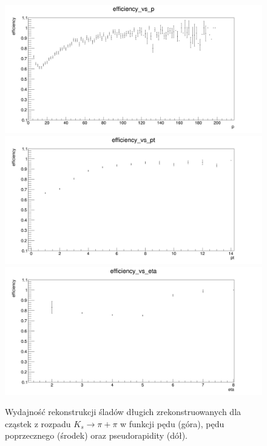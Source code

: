 \begin{figure}[H]
\includegraphics[scale=0.25]{rozdzial6/KsLL_p.png} \\
\includegraphics[scale=0.25]{rozdzial6/KsLL_pt.png} \\
\includegraphics[scale=0.25]{rozdzial6/KsLL_eta.png} \\ 
\caption{Wydajność rekonstrukcji śladów długich zrekonstruowanych dla cząstek z rozpadu $K_s \rightarrow \pi + \pi $  w funkcji pędu (góra), pędu poprzecznego (środek) oraz pseudorapidity (dół).}
\label{KsLL}
\end{figure}

